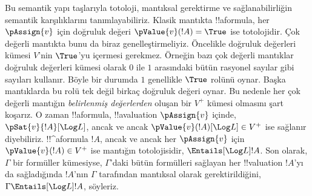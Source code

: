 Bu semantik yapı taşlarıyla totoloji, mantıksal gerektirme ve
sağlanabilirliğin semantik karşılıklarını tanımlayabiliriz. Klasik mantıkta
!!a{formula}, her $\pAssign{v}$ için doğruluk değeri
$\pValue{v}(!A)=\True$ ise totolojidir. Çok değerli mantıkta bunu da biraz
genelleştirmeliyiz. Öncelikle doğruluk değerleri kümesi $V$'nin $\True$'yu
içermesi gerekmez. Örneğin bazı çok değerli mantıklar doğruluk değerleri
kümesi olarak $0$ ile $1$ arasındaki bütün rasyonel sayılar gibi sayıları
kullanır. Böyle bir durumda $1$ genellikle $\True$ rolünü oynar. Başka
mantıklarda bu rolü tek değil birkaç doğruluk değeri oynar. Bu nedenle her
çok değerli mantığın \emph{belirlenmiş değerlerden} oluşan bir $V^+$ kümesi
olmasını şart koşarız. O zaman !!a{formula}, !!a{valuation}
$\pAssign{v}$ içinde, $\pSat{v}{!A}[\Log L]$, ancak ve ancak
$\pValue{v}(!A)[\Log L]\in V^+$ ise sağlanır diyebiliriz. !!^a{formula}
$!A$, ancak ve ancak her $\pAssign{v}$ için $\pValue{v}(!A)\in V^+$ ise
  mantığın totolojisidir, $\Entails[\Log L] !A$. Son olarak, $\Gamma$ bir
  formüller kümesiyse, $\Gamma$'daki bütün formülleri sağlayan her
  !!{valuation} $!A$'yı da sağladığında $!A$'nın $\Gamma$ tarafından
  mantıksal olarak gerektirildiğini, $\Gamma\Entails[\Log L]!A$, söyleriz.

